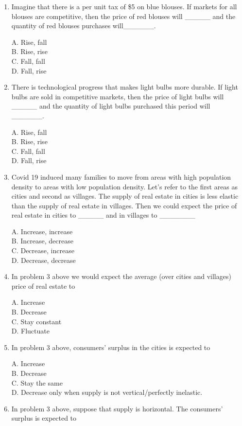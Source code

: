 \documentclass[
]{book}
\begin{document}
\begin{enumerate}
\def\labelenumi{\arabic{enumi}.}
\item
  Imagine that there is a per unit tax of \$5 on blue blouses. If markets for all blouses are competitive, then the price of red blouses will \_\_\_\_\_ and the quantity of red blouses purchases will\_\_\_\_\_\_.

  A. Rise, fall\\
  B. Rise, rise\\
  C. Fall, fall\\
  D. Fall, rise
\item
  There is technological progress that makes light bulbs more durable. If light bulbs are sold in competitive markets, then the price of light bulbs will \_\_\_\_\_ and the quantity of light bulbs purchased this period will \_\_\_\_\_\_.

  A. Rise, fall\\
  B. Rise, rise\\
  C. Fall, fall\\
  D. Fall, rise
\item
  Covid 19 induced many families to move from areas with high population density to areas with low population density. Let's refer to the first areas as cities and second as villages. The supply of real estate in cities is less elastic than the supply of real estate in villages. Then we could expect the price of real estate in cities to \_\_\_\_\_ and in villages to \_\_\_\_\_\_\_

  A. Increase, increase\\
  B. Increase, decrease\\
  C. Decrease, increase\\
  D. Decrease, decrease
\item
  In problem 3 above we would expect the average (over cities and villages) price of real estate to

  A. Increase\\
  B. Decrease\\
  C. Stay constant\\
  D. Fluctuate
\item
  In problem 3 above, consumers' surplus in the cities is expected to

  A. Increase\\
  B. Decrease\\
  C. Stay the same\\
  D. Decrease only when supply is not vertical/perfectly inelastic.
\item
  In problem 3 above, suppose that supply is horizontal. The consumers' surplus is expected to


\end{enumerate}
\end{document}
